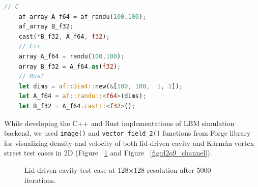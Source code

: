 \begin{lstlisting}[language=Rust, caption={Converting to single precision floating point for Forge visualization in C, C++ and Rust}, label=forge-cast-f32]
	// C
	af_array A_f64 = af_randu(100,100);
	af_array B_f32;
	cast(*B_f32, A_f64, f32);
	// C++
	array A_f64 = randu(100,100);
	array B_f32 = A_f64.as(f32);
	// Rust
	let dims = af::Dim4::new(&[100, 100,  1, 1]);
	let A_f64 = af::randu::<f64>(dims);
	let B_f32 = A_f64.cast::<f32>();
\end{lstlisting}

While developing the C++ and Rust implementations of LBM simulation backend, we used \texttt{image()} and \texttt{vector_field_2()} functions from Forge library for visualizing density and velocity of both lid-driven cavity and Kármán vortex street test cases in 2D (Figure~ \ref{fig:d2q9_lid} and Figure~ \ref{fig:d2q9_channel}).

\begin{figure}[!ht]
	\centering
	\qquad
	\captionsetup{justification=centering}
	\caption{Lid-driven cavity test case at 128$\times$128 resolution after 5000 iterations.}
	\label{fig:d2q9_lid}
\end{figure}

